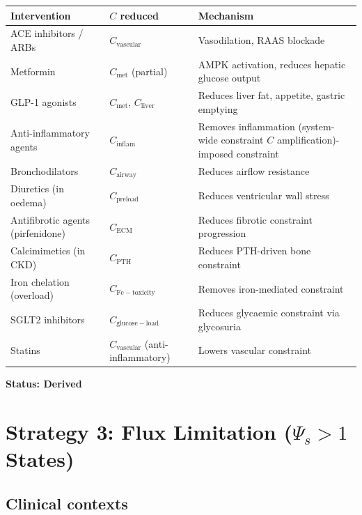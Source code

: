 \documentclass[12pt,a4paper]{article}
\begin{document}
\begin{center}
\begin{tabular}{lll}
\toprule
Intervention & $C$ reduced & Mechanism \\
\midrule
ACE inhibitors / ARBs & $C_{\mathrm{vascular}}$ & Vasodilation, RAAS blockade \\
Metformin & $C_{\mathrm{met}}$ (partial) & AMPK activation, reduces hepatic glucose output \\
GLP-1 agonists & $C_{\mathrm{met}}$, $C_{\mathrm{liver}}$ & Reduces liver fat, appetite, gastric emptying \\
Anti-inflammatory agents & $C_{\mathrm{inflam}}$ & Removes inflammation (system-wide constraint $C$ amplification)-imposed constraint \\
Bronchodilators & $C_{\mathrm{airway}}$ & Reduces airflow resistance \\
Diuretics (in oedema) & $C_{\mathrm{preload}}$ & Reduces ventricular wall stress \\
Antifibrotic agents (pirfenidone) & $C_{\mathrm{ECM}}$ & Reduces fibrotic constraint progression \\
Calcimimetics (in CKD) & $C_{\mathrm{PTH}}$ & Reduces PTH-driven bone constraint \\
Iron chelation (overload) & $C_{\mathrm{Fe-toxicity}}$ & Removes iron-mediated constraint \\
SGLT2 inhibitors & $C_{\mathrm{glucose-load}}$ & Reduces glycaemic constraint via glycosuria \\
Statins & $C_{\mathrm{vascular}}$ (anti-inflammatory) & Lowers vascular constraint \\
\bottomrule
\end{tabular}
\end{center}

\textbf{Status: Derived}

\section{Strategy 3: Flux Limitation ($\Psi_s > 1$ States)}

\subsection{Clinical contexts}
\end{document}
